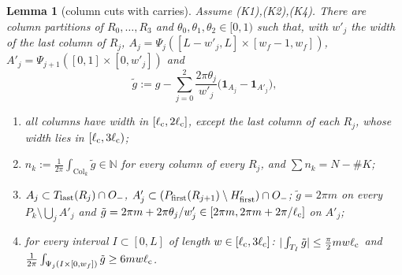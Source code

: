 \documentclass[11pt]{article}
\newtheorem{lemma}[theorem]{Lemma}
\theoremstyle{definition}
\theoremstyle{remark}
\newcommand{\N}{\mathbb N}
\newcommand{\lc}{\ell_{\rm c}}
\begin{document}
\begin{lemma}[column cuts with carries]\label{lem:cuts}
Assume (K1),(K2),(K4). There are column partitions of $R_0,\dots,R_3$ and $\theta_0,\theta_1,\theta_2\in[0,1)$ such that, with $w'_j$ the width of the last column of
$R_j$, $A_j=\Psi_j([L-w'_j,L]\times[w_f-1,w_f])$, $A'_j=\Psi_{j+1}([0,1]\times[0,w'_j])$ and
\[
\tilde g:=g-\sum_{j=0}^2\frac{2\pi\theta_j}{w'_j}\bigl(\mathbf 1_{A_j}-\mathbf 1_{A'_j}\bigr),
\]
\begin{enumerate}[label=(\alph*)]
\item all columns have width in $[\lc,2\lc]$, except the last column of each $R_j$, whose width lies in $[\lc,3\lc)$;
\item $n_k:=\frac1{2\pi}\int_{\mathrm{Col}_k}\tilde g\in\N$ for every column of every $R_j$, and $\sum n_k=N-\#K$;
\item $A_j\subset T_{\rm last}(R_j)\cap O_-$, $A'_j\subset(P_{\rm first}(R_{j+1})\setminus H'_{\rm first})\cap O_-$; $\tilde g=2\pi m$ on every $P_k\setminus\bigcup_jA'_j$ and
  $\tilde g=2\pi m+2\pi\theta_j/w'_j\in[2\pi m,2\pi m+2\pi/\lc]$ on $A'_j$;
\item for every interval $I\subset[0,L]$ of length $w\in[\lc,3\lc]$: $|\int_{T_I}\tilde g|\le\frac\pi2mw\lc$ and $\frac1{2\pi}\int_{\Psi_j(I\times[0,w_f])}\tilde g\ge6mw\lc$.
\end{enumerate}
\end{lemma}
\end{document}
